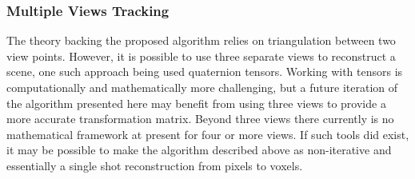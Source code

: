 \subsubsection{Multiple Views Tracking}
The theory backing the proposed algorithm relies on triangulation between two view points.
However, it is possible to use three separate views to reconstruct a scene, one such approach being used quaternion tensors.
Working with tensors is computationally and mathematically more challenging, but a future iteration of the algorithm presented here may benefit from using three views to provide a more accurate transformation matrix.
Beyond three views there currently is no mathematical framework at present for four or more views.
If such tools did exist, it may be possible to make the algorithm described above as non-iterative and essentially a single shot reconstruction from pixels to voxels.

